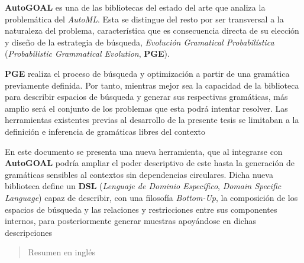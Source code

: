 \begin{resumen}
    {\bf AutoGOAL} es una de las bibliotecas del estado del arte que analiza la
    problemática del {\it AutoML}. Esta se distingue del resto por ser transversal
    a la naturaleza del problema, característica que es consecuencia directa
    de su elección y diseño de la estrategia de búsqueda,
    {\it Evolución Gramatical Probabilística}
    ({\it Probabilistic Grammatical Evolution}, {\bf PGE}).

        {\bf PGE} realiza el proceso de búsqueda y optimización a partir de una
    gramática previamente definida. Por tanto, mientras mejor sea la
    capacidad de la biblioteca para describir espacios de búsqueda y generar
    sus respectivas gramáticas, más amplio será el conjunto de los problemas
    que esta podrá intentar resolver. Las herramientas existentes previas al
    desarrollo de la presente tesis se limitaban a la definición e inferencia
    de gramáticas libres del contexto

    En este documento se presenta una nueva herramienta, que al integrarse con
        {\bf AutoGOAL} podría ampliar el poder descriptivo de este hasta la
    generación de gramáticas sensibles al contextos sin dependencias circulares.
    Dicha nueva biblioteca define un {\bf DSL}
    ({\it Lenguaje de Dominio Específico}, {\it Domain Specific Language}) capaz de
    describir, con una filosofía {\it Bottom-Up}, la composición de los
    espacios de búsqueda y las relaciones y restricciones entre sus
    componentes internos, para posteriormente generar muestras apoyándose en
    dichas descripciones

\end{resumen}

\begin{abstract}
    Resumen en inglés
\end{abstract}